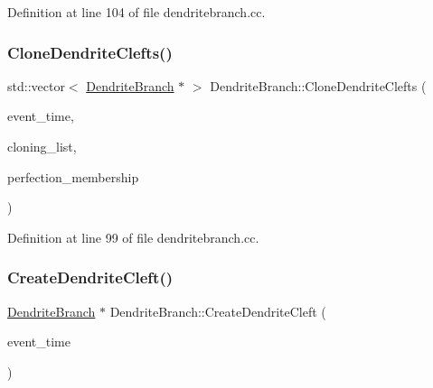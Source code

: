 Definition at line 104 of file dendritebranch.\+cc.

\mbox{\label{class_dendrite_branch_a3cf1e07fe5e0ea827965c0dc76881c9f}} 
\subsubsection{\texorpdfstring{Clone\+Dendrite\+Clefts()}{CloneDendriteClefts()}}
{\footnotesize\ttfamily std\+::vector$<$ \mbox{\hyperlink{class_dendrite_branch}{Dendrite\+Branch}} $\ast$ $>$ Dendrite\+Branch\+::\+Clone\+Dendrite\+Clefts (\begin{DoxyParamCaption}\item[{std\+::chrono\+::time\+\_\+point$<$ \mbox{\hyperlink{universe_8h_a0ef8d951d1ca5ab3cfaf7ab4c7a6fd80}{Clock}} $>$}]{event\+\_\+time,  }\item[{std\+::vector$<$ \mbox{\hyperlink{class_dendrite_branch}{Dendrite\+Branch}} $\ast$$>$}]{cloning\+\_\+list,  }\item[{double}]{perfection\+\_\+membership }\end{DoxyParamCaption})}



Definition at line 99 of file dendritebranch.\+cc.

\mbox{\label{class_dendrite_branch_a4f751442a537f2e3d7d0dc66a09bd84b}} 
\subsubsection{\texorpdfstring{Create\+Dendrite\+Cleft()}{CreateDendriteCleft()}}
{\footnotesize\ttfamily \mbox{\hyperlink{class_dendrite_branch}{Dendrite\+Branch}} $\ast$ Dendrite\+Branch\+::\+Create\+Dendrite\+Cleft (\begin{DoxyParamCaption}\item[{std\+::chrono\+::time\+\_\+point$<$ \mbox{\hyperlink{universe_8h_a0ef8d951d1ca5ab3cfaf7ab4c7a6fd80}{Clock}} $>$}]{event\+\_\+time }\end{DoxyParamCaption})}



